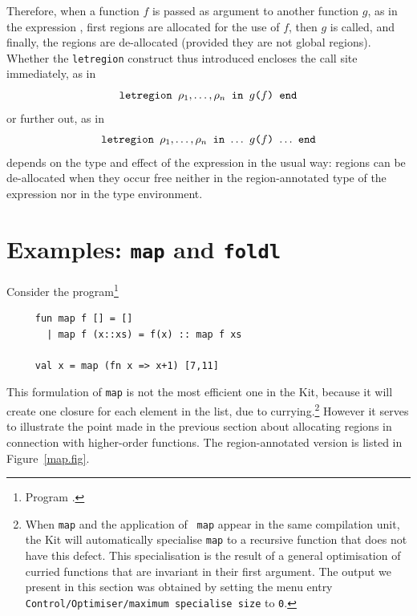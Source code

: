 \documentclass[12pt]{book}
\begin{document}
Therefore, when a function $f$ is passed as argument to another
function $g$, as in the expression , first regions are
allocated for the use of $f$, then $g$ is called, and finally, the
regions are de-allocated (provided they are not global regions).
Whether the {\tt letregion} construct thus introduced encloses the
call site immediately, as in
$$\hbox{\tt letregion $\rho_1,\ldots,\rho_n$ in $g$($f$) end}$$
or further out, as in
$$\hbox{\tt letregion $\rho_1,\ldots,\rho_n$ in $\ldots$ $g$($f$)
  $\ldots$ end}$$
depends on the type and effect of the expression
 in the usual way: regions can be de-allocated when
they occur free neither in the region-annotated type of the expression
nor in the type environment.

\section{Examples: {\tt map} and {\tt foldl}}
Consider the program\footnote{Program .}
\begin{verbatim}
     fun map f [] = []
       | map f (x::xs) = f(x) :: map f xs
    
     val x = map (fn x => x+1) [7,11]
\end{verbatim}
This formulation of {\tt map} is not the most efficient one in the
Kit, because it will create one closure for each element in the list,
due to currying.\footnote{When {\tt map} and the application of {\tt
    map} appear in the same compilation unit, the Kit will
  automatically specialise {\tt map} to a recursive function that does
  not have this defect. This specialisation is the result of a general
  optimisation of curried functions that are invariant in their first
  argument. The output we present in this section was obtained by
  setting the menu entry {\tt Control/Optimiser/maximum specialise
    size} to {\tt 0}.} However it serves to illustrate the point made
in the previous section about allocating regions in connection with
higher-order functions. The region-annotated version is listed in
Figure~\ref{map.fig}.
\end{document}
